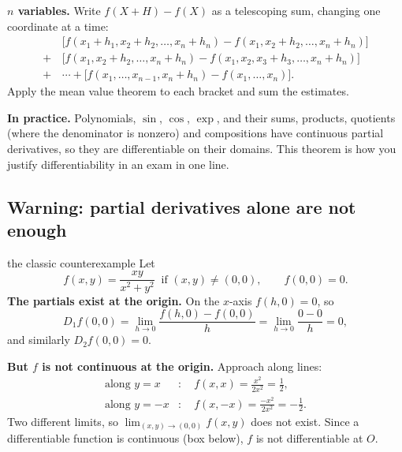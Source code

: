 \begin{extra}
\textbf{$n$ variables.} Write $f(X+H)-f(X)$ as a telescoping sum, changing one coordinate
at a time:
\begin{align*}
 &\big[f(x_1+h_1,x_2+h_2,\dots,x_n+h_n)-f(x_1,x_2+h_2,\dots,x_n+h_n)\big]\\
 +\,&\big[f(x_1,x_2+h_2,\dots,x_n+h_n)-f(x_1,x_2,x_3+h_3,\dots,x_n+h_n)\big]\\
 +\,&\cdots+\big[f(x_1,\dots,x_{n-1},x_n+h_n)-f(x_1,\dots,x_n)\big].
\end{align*}
Apply the mean value theorem to each bracket and sum the estimates.

\textbf{In practice.} Polynomials, $\sin$, $\cos$, $\exp$, and their sums, products,
quotients (where the denominator is nonzero) and compositions have continuous partial
derivatives, so they are differentiable on their domains. This theorem is how you justify
differentiability in an exam in one line.
\end{extra}

\subsection{Warning: partial derivatives alone are not enough}\label{sec:counter}

\begin{example}{the classic counterexample}
Let
\[
f(x,y)=\frac{xy}{x^2+y^2}\ \text{ if }(x,y)\neq(0,0),\qquad f(0,0)=0 .
\]
\textbf{The partials exist at the origin.} On the $x$-axis $f(h,0)=0$, so
\[ D_1f(0,0)=\lim_{h\to0}\frac{f(h,0)-f(0,0)}{h}=\lim_{h\to0}\frac{0-0}{h}=0, \]
and similarly $D_2f(0,0)=0$.

\textbf{But $f$ is not continuous at the origin.} Approach along lines:
\begin{align*}
\text{along }y=x&:\quad f(x,x)=\frac{x^2}{2x^2}=\frac12,\\
\text{along }y=-x&:\quad f(x,-x)=\frac{-x^2}{2x^2}=-\frac12 .
\end{align*}
Two different limits, so $\lim_{(x,y)\to(0,0)}f(x,y)$ does not exist. Since a differentiable
function is continuous (box below), $f$ is not differentiable at $O$.
\end{example}

